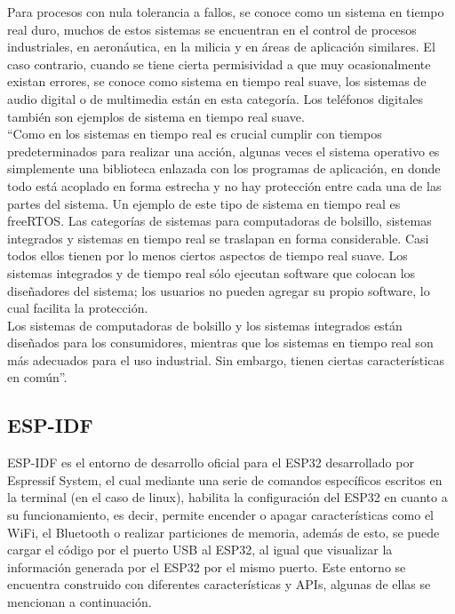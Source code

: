Para procesos con nula tolerancia a fallos, se conoce como un sistema en tiempo real duro, muchos de estos sistemas se encuentran en el control de procesos industriales, en aeronáutica, en la milicia y en áreas de aplicación similares. El caso contrario, cuando se tiene cierta permisividad a que muy ocasionalmente existan errores, se conoce como sistema en tiempo real suave, los sistemas de audio digital o de multimedia están en esta categoría. Los teléfonos digitales también son ejemplos de sistema en tiempo real suave. \cite{SO} \\

``Como en los sistemas en tiempo real es crucial cumplir con tiempos predeterminados para realizar una acción, algunas veces el sistema operativo es simplemente una biblioteca enlazada con los programas de aplicación, en donde todo está acoplado en forma estrecha y no hay protección entre cada una de las partes del sistema. Un ejemplo de este tipo de sistema en tiempo real es freeRTOS.  Las categorías de sistemas para computadoras de bolsillo, sistemas integrados y sistemas en tiempo real se traslapan en forma considerable. Casi todos ellos tienen por lo menos ciertos aspectos de tiempo real suave. Los sistemas integrados y de tiempo real sólo ejecutan software que colocan los diseñadores del sistema; los usuarios no pueden agregar su propio software, lo cual facilita la protección. \\

Los sistemas de computadoras de bolsillo y los sistemas integrados están diseñados para los consumidores, mientras que los sistemas en tiempo real son más adecuados para el uso industrial. Sin embargo, tienen ciertas características en común''. \cite{SO}

\subsection{ESP-IDF}

ESP-IDF es el entorno de desarrollo oficial para el ESP32 desarrollado por Espressif System, el cual mediante una serie de comandos específicos escritos en la terminal (en el caso de linux), habilita la configuración del ESP32 en cuanto a su funcionamiento, es decir, permite encender o apagar características como el WiFi, el Bluetooth o realizar particiones de memoria, además de esto, se puede cargar el código por el puerto USB al ESP32, al igual que visualizar la información generada por el ESP32 por el mismo puerto. Este entorno se encuentra construido con diferentes características y APIs, algunas de ellas se mencionan a continuación. \cite{ES}

